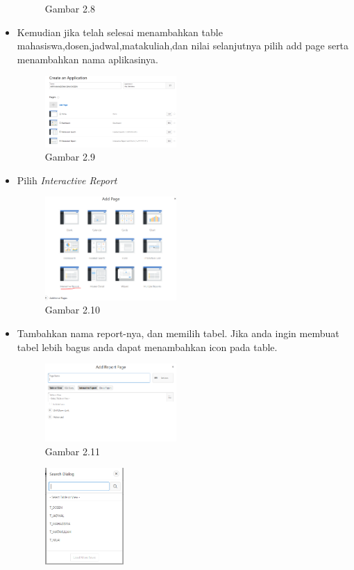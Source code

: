 \documentclass{article}
\begin{document}
\begin{itemize}
\begin{figure}[ht]
                    \caption{Gambar 2.8}
                \end{figure}
            \item Kemudian jika telah selesai menambahkan table mahasiswa,dosen,jadwal,matakuliah,dan nilai selanjutnya pilih add page serta menambahkan nama aplikasinya.
                \begin{figure}[ht]
                    \centerline{\includegraphics[width=5cm]{Capture15.PNG}}
                    \caption{Gambar 2.9}
                \end{figure}
            \item Pilih \textit{Interactive Report}
                \begin{figure}[ht]
                    \centerline{\includegraphics[width=5cm]{Capture16.PNG}}
                    \caption{Gambar 2.10}
                \end{figure}
            \newpage
            \item Tambahkan nama report-nya, dan memilih tabel. Jika anda ingin membuat tabel lebih bagus anda dapat menambahkan icon pada table.
                \begin{figure}[ht]
                    \centerline{\includegraphics[width=5cm]{Capture17.PNG}}
                    \caption{Gambar 2.11}
                \end{figure}
                \begin{figure}[ht]
                    \centerline{\includegraphics[width=3cm]{Capture19.PNG}}

\end{figure}
\end{itemize}
\end{document}
